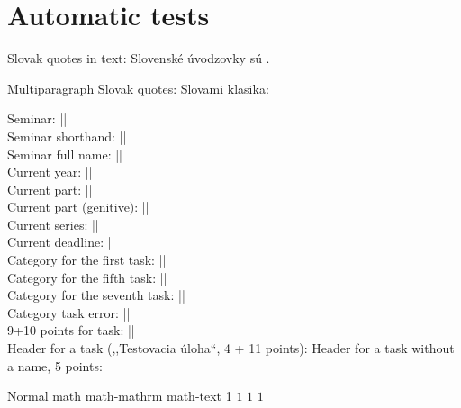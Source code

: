\newpage
\chapter{\Huge Automatic tests}

    Slovak quotes in text: Slovenské úvodzovky sú .
 
    Multiparagraph Slovak quotes: Slovami klasika:
    
    Seminar: |\seminarID|\\
    Seminar shorthand: |\seminarShort|\\
    Seminar full name: |\seminarFull|\\
    
    Current year: |\currentYear|\\
    Current part: |\currentPart|\\
    Current part (genitive): |\currentPartGenitive|\\
    Current series: |\currentSeries|\\        
    Current deadline: |\currentDeadline|\\
    
    Category for the first task: ||\\
    Category for the fifth task: ||\\
    Category for the seventh task: ||\\
    Category task error: ||\\
    
    9+10 points for task: |\formatTaskPoints[9][10]|\\
    Header for a task (,,Testovacia úloha``, 4 + 11 points): 
    Header for a task without a name, 5 points: \createTaskHeader[][5][]
    
    Normal math math-mathrm math-text
    1 $1$ $\mathrm{1}$ $\text{1}$
    
    